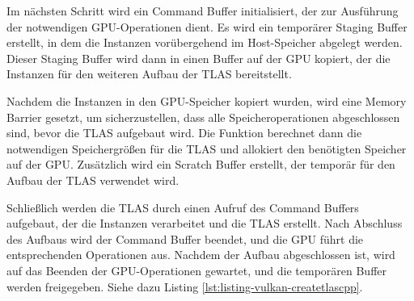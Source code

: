 \documentclass[11pt]{scrartcl}
\begin{document}
	Im nächsten Schritt wird ein Command Buffer initialisiert, der zur Ausführung der notwendigen GPU-Operationen dient. Es wird ein temporärer Staging Buffer erstellt, in dem die Instanzen vorübergehend im Host-Speicher abgelegt werden. Dieser Staging Buffer wird dann in einen Buffer auf der GPU kopiert, der die Instanzen für den weiteren Aufbau der TLAS bereitstellt.
	
	Nachdem die Instanzen in den GPU-Speicher kopiert wurden, wird eine Memory Barrier gesetzt, um sicherzustellen, dass alle Speicheroperationen abgeschlossen sind, bevor die TLAS aufgebaut wird. Die Funktion berechnet dann die notwendigen Speichergrößen für die TLAS und allokiert den benötigten Speicher auf der GPU. Zusätzlich wird ein Scratch Buffer erstellt, der temporär für den Aufbau der TLAS verwendet wird.
	
	Schließlich werden die TLAS durch einen Aufruf des Command Buffers aufgebaut, der die Instanzen verarbeitet und die TLAS erstellt. Nach Abschluss des Aufbaus wird der Command Buffer beendet, und die GPU führt die entsprechenden Operationen aus. Nachdem der Aufbau abgeschlossen ist, wird auf das Beenden der GPU-Operationen gewartet, und die temporären Buffer werden freigegeben. Siehe dazu Listing \ref{lst:listing-vulkan-createtlascpp}.
	
\end{document}
